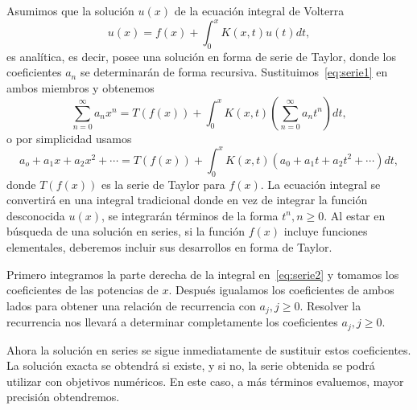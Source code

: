 Asumimos que la solución $u(x)$ de la ecuación integral de Volterra
\begin{equation}
	u(x) = f(x) + \int_0^x K(x,t)u(t)dt,
\end{equation}
es analítica, es decir, posee una solución en forma de serie de Taylor, donde los coeficientes $a_n$ se determinarán de forma recursiva. Sustituimos~\eqref{eq:serie1} en ambos miembros y obtenemos
\begin{equation}\label{eq:serie2}
	\sum_{n=0}^{\infty}a_nx^n = T(f(x)) + \int_{0}^{x}K(x,t)(\sum_{n=0}^{\infty}a_nt^n)dt,
\end{equation}
o por simplicidad usamos
\begin{equation}
	a_o + a_1x + a_2x^2 + \cdots = T(f(x)) + \int_{0}^{x}K(x,t) (a_0+a_1t+a_2t^2+\cdots)dt,
\end{equation}
donde $T(f(x))$ es la serie de Taylor para $f(x)$. La ecuación integral se convertirá en una integral tradicional donde en vez de integrar la función desconocida $u(x)$, se integrarán términos de la forma $t^n,n\geqslant0$. Al estar en búsqueda de una solución en series, si la función $f(x)$ incluye funciones elementales, deberemos incluir sus desarrollos en forma de Taylor.

Primero integramos la parte derecha de la integral en~\eqref{eq:serie2} y tomamos los coeficientes de las potencias de $x$. Después igualamos los coeficientes de ambos lados para obtener una relación de recurrencia con $a_j, j\geqslant0$. Resolver la recurrencia nos llevará a determinar completamente los coeficientes $a_j, j\geqslant0$.

Ahora la solución en series se sigue inmediatamente de sustituir estos coeficientes. La solución exacta se obtendrá si existe, y si no, la serie obtenida se podrá utilizar con objetivos numéricos. En este caso, a más términos evaluemos, mayor precisión obtendremos.

